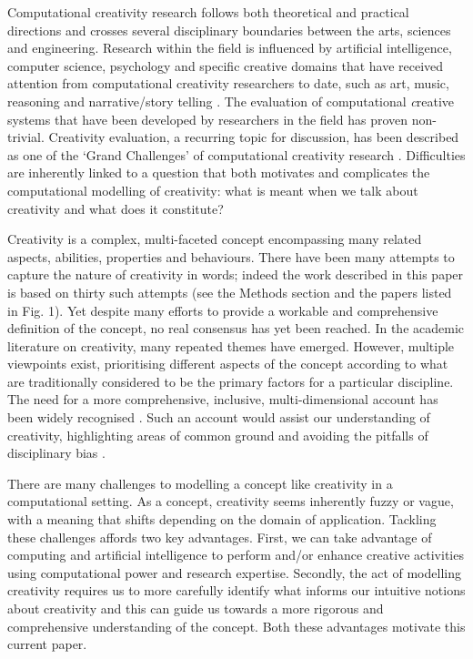 \documentclass[10pt,letterpaper]{article}
\begin{document}
Computational creativity research follows both theoretical and practical directions and crosses several disciplinary boundaries between the arts, sciences and engineering. Research within the field is influenced by artificial intelligence, computer science, psychology and specific creative domains that have received attention from computational creativity researchers to date, such as art, music, reasoning and narrative/story telling \cite[provide examples]{colton08,widmerAIM09,leon10MM,perezyperez99}. The evaluation of computational {\emph creative systems} that have been developed by researchers in the field has proven non-trivial. Creativity evaluation, a recurring topic for discussion, has been described as one of the `Grand Challenges' of computational creativity research \cite{cardoso09}. Difficulties are inherently linked to a question that both motivates and complicates the computational modelling of creativity: what is meant when we talk about creativity and what does it constitute?

Creativity is a complex, multi-faceted concept encompassing many related aspects, abilities, properties and behaviours. There have been many attempts to capture the nature of creativity in words; indeed the work described in this paper is based on thirty such attempts (see the Methods section and the papers listed in Fig. 1).  %
Yet despite many efforts to provide a workable and comprehensive definition of the concept, no real consensus has yet been reached. In the academic literature on creativity, many repeated themes have emerged. However, multiple viewpoints exist, prioritising different aspects of the concept according to what are traditionally considered to be the primary factors for a particular discipline. The need for a more comprehensive, inclusive, multi-dimensional  account has been widely recognised \cite{rhodes61,torrance67,plucker04defn,kaufman09}. Such an account would assist our understanding of creativity, highlighting areas of common ground and avoiding the pitfalls of disciplinary bias \cite{hennessey10,plucker04}.

There are many challenges to modelling a concept like creativity in a computational setting. As a concept, creativity seems inherently fuzzy or vague, with a meaning that shifts depending on the domain of application. Tackling these challenges affords two key advantages. First, we can take advantage of computing and artificial intelligence to perform and/or enhance creative activities using computational power and research expertise. Secondly, the act of modelling creativity requires us to more carefully identify what informs our intuitive notions about creativity and this can guide us towards a more rigorous and comprehensive understanding of the concept. Both these advantages motivate this current paper. 
\end{document}
